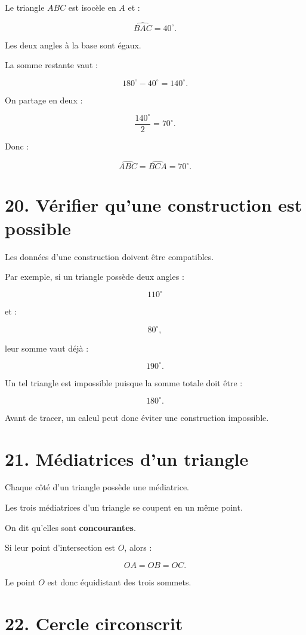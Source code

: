 Le triangle $ABC$ est isocèle en $A$ et :

\[
\widehat{BAC}=40^\circ.
\]

Les deux angles à la base sont égaux.

La somme restante vaut :

\[
180^\circ-40^\circ=140^\circ.
\]

On partage en deux :

\[
\dfrac{140^\circ}{2}=70^\circ.
\]

Donc :

\[
\widehat{ABC}
=
\widehat{BCA}
=
70^\circ.
\]

\section{20. Vérifier qu’une construction est possible}

Les données d’une construction doivent être compatibles.

Par exemple, si un triangle possède deux angles :

\[
110^\circ
\]

et :

\[
80^\circ,
\]

leur somme vaut déjà :

\[
190^\circ.
\]

Un tel triangle est impossible puisque la somme totale doit être :

\[
180^\circ.
\]

Avant de tracer, un calcul peut donc éviter une construction impossible.

\section{21. Médiatrices d’un triangle}

Chaque côté d’un triangle possède une médiatrice.

Les trois médiatrices d’un triangle se coupent en un même point.

On dit qu’elles sont \textbf{concourantes}.

Si leur point d’intersection est $O$, alors :

\[
OA=OB=OC.
\]

Le point $O$ est donc équidistant des trois sommets.

\section{22. Cercle circonscrit}

